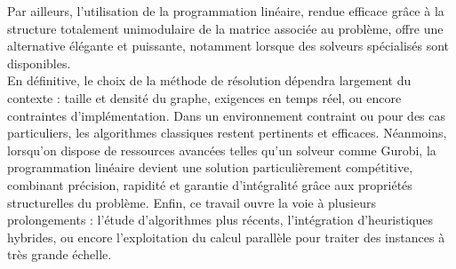 \documentclass[a4paper]{article}
\begin{document}
Par ailleurs, l’utilisation de la programmation linéaire, rendue efficace grâce à la structure totalement unimodulaire de la matrice associée au problème, offre une alternative élégante et puissante, notamment lorsque des solveurs spécialisés sont disponibles.\\

En définitive, le choix de la méthode de résolution dépendra largement du contexte : taille et densité du graphe, exigences en temps réel, ou encore contraintes d’implémentation. Dans un environnement contraint ou pour des cas particuliers, les algorithmes classiques restent pertinents et efficaces. Néanmoins, lorsqu’on dispose de ressources avancées telles qu’un solveur comme Gurobi, la programmation linéaire devient une solution particulièrement compétitive, combinant précision, rapidité et garantie d’intégralité grâce aux propriétés structurelles du problème. Enfin, ce travail ouvre la voie à plusieurs prolongements : l’étude d’algorithmes plus récents, l’intégration d’heuristiques hybrides, ou encore l’exploitation du calcul parallèle pour traiter des instances à très grande échelle.

\printbibliography[heading=bibintoc]
\end{document}

